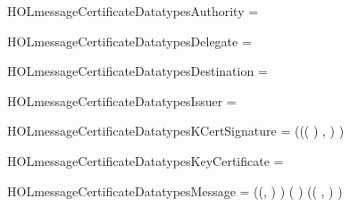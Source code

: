 \newcommand{\HOLmessageCertificateDate}{20 August 2016}
\newcommand{\HOLmessageCertificateTime}{12:36}
\begin{SaveVerbatim}{HOLmessageCertificateDatatypesAuthority}
 =  
\end{SaveVerbatim}
\newcommand{\HOLmessageCertificateDatatypesAuthority}{\UseVerbatim{HOLmessageCertificateDatatypesAuthority}}
\begin{SaveVerbatim}{HOLmessageCertificateDatatypesDelegate}
 =  
\end{SaveVerbatim}
\newcommand{\HOLmessageCertificateDatatypesDelegate}{\UseVerbatim{HOLmessageCertificateDatatypesDelegate}}
\begin{SaveVerbatim}{HOLmessageCertificateDatatypesDestination}
 =  
\end{SaveVerbatim}
\newcommand{\HOLmessageCertificateDatatypesDestination}{\UseVerbatim{HOLmessageCertificateDatatypesDestination}}
\begin{SaveVerbatim}{HOLmessageCertificateDatatypesIssuer}
 =  
\end{SaveVerbatim}
\newcommand{\HOLmessageCertificateDatatypesIssuer}{\UseVerbatim{HOLmessageCertificateDatatypesIssuer}}
\begin{SaveVerbatim}{HOLmessageCertificateDatatypesKCertSignature}
 =
     ((( \HOLTokenProd{}  \HOLTokenProd{}  )
              , ) )
\end{SaveVerbatim}
\newcommand{\HOLmessageCertificateDatatypesKCertSignature}{\UseVerbatim{HOLmessageCertificateDatatypesKCertSignature}}
\begin{SaveVerbatim}{HOLmessageCertificateDatatypesKeyCertificate}
 =     
\end{SaveVerbatim}
\newcommand{\HOLmessageCertificateDatatypesKeyCertificate}{\UseVerbatim{HOLmessageCertificateDatatypesKeyCertificate}}
\begin{SaveVerbatim}{HOLmessageCertificateDatatypesMessage}
 =
        ((, ) )
        ( ) (( , ) )
\end{SaveVerbatim}
